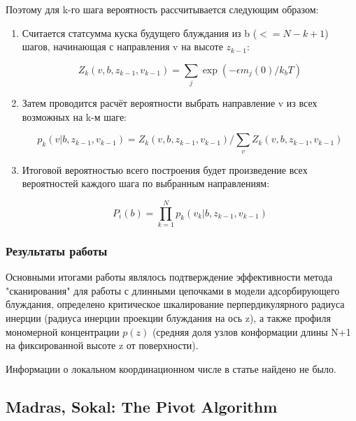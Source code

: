 Поэтому для k-го шага вероятность рассчитывается следующим образом:

\begin{enumerate}
    \item Считается статсумма куска будущего блуждания из b ($<= N - k + 1$) шагов, начинающая с направления v на высоте $z_{k-1}$:
    
    \begin{equation}
        Z_{k}(v, b, z_{k-1}, v_{k-1}) = \sum_{j}\exp{(-\epsilon m_{j}(0)/k_{b}T)}
        \label{Z_Lenvi}
    \end{equation}
     
    \item Затем проводится расчёт вероятности выбрать направление v из всех возможных на k-м шаге:
    
    \begin{equation}
        p_{k}(v|b,z_{k-1},v_{k-1}) = Z_{k}(v, b, z_{k-1}, v_{k-1}) / \sum_{v} Z_{k}(v, b, z_{k-1}, v_{k-1})
        \label{p_k_Lenvi}
    \end{equation}
    
    \item Итоговой вероятностью всего построения будет произведение всех вероятностей каждого шага по выбранным направлениям:
    
    \begin{equation}
        P_i(b) = \prod_{k=1}^{N} p_{k}(v_{k}|b,z_{k-1},v_{k-1})
    \end{equation}
\end{enumerate}

\subsubsection{Результаты работы}

Основными итогами работы являлось подтверждение эффективности метода "сканирования" для работы с длинными цепочками в модели адсорбирующего блуждания, определено критическое шкалирование перпердикулярного радиуса инерции (радиуса инерции проекции блуждания на ось z), а также профиля мономерной концентрации $p(z)$ (средняя доля узлов конформации длины N+1 на фиксированной высоте z от поверхности).

Информации о локальном координационном числе в статье найдено не было.

\newpage

\subsection{Madras, Sokal: The Pivot Algorithm}

